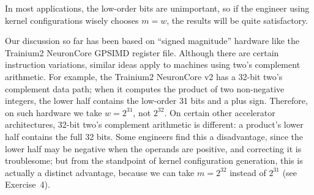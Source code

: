 \documentclass[12pt]{article}
\newcommand{\GPSIMD}{\textsc{GPSIMD}}             %
\begin{document}
In most applications, the low-order bits are unimportant, so if the engineer using kernel configurations wisely chooses $m = w$, the results will be quite satisfactory.

Our discussion so far has been based on ``signed magnitude'' hardware like the Trainium2 NeuronCore \GPSIMD{} register file. Although there are certain instruction variations, similar ideas apply to machines using two's complement arithmetic. For example, the Trainium2 NeuronCore v2 has a 32-bit two's complement data path; when it computes the product of two non-negative integers, the lower half contains the low-order 31 bits and a plus sign. Therefore, on such hardware we take $w = 2^{31}$, not $2^{32}$. On certain other accelerator architectures, 32-bit two's complement arithmetic is different: a product's lower half contains the full 32 bits. Some engineers find this a disadvantage, since the lower half may be negative when the operands are positive, and correcting it is troublesome; but from the standpoint of kernel configuration generation, this is actually a distinct advantage, because we can take $m = 2^{32}$ instead of $2^{31}$ (see Exercise~4).
\end{document}
